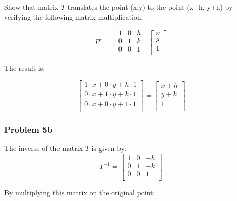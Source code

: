 \documentclass{article}
\begin{document}
Show that matrix $T$ translates the point (x,y)  to the point (x+h, y+h) by verifying the following matrix
multiplication.

\[
  P' =
  \left[ {\begin{array}{ccc}
    1 & 0 & h\\
    0 & 1 & k\\
    0 & 0 & 1\\
  \end{array} } \right]
\left[ {\begin{array}{c}
    x\\
    y\\
    1\\    
  \end{array} } \right]  
\]

The result is:

\[
\begin{bmatrix}
    1 \cdot x + 0 \cdot y + h \cdot 1 \\
    0 \cdot x + 1 \cdot y + k \cdot 1 \\
    0 \cdot x + 0 \cdot y + 1 \cdot 1 \\
\end{bmatrix}
=
\begin{bmatrix}
    x + h \\
    y + k \\
    1 \\
\end{bmatrix}
\]

\subsubsection*{Problem 5b}

The inverse of the matrix \( T \) is given by:
\[
T^{-1} =
\left[ \begin{array}{ccc}
1 & 0 & -h \\
0 & 1 & -k \\
0 & 0 & 1 \\
\end{array} \right]
\]

By multiplying this matrix on the original point:
\end{document}
